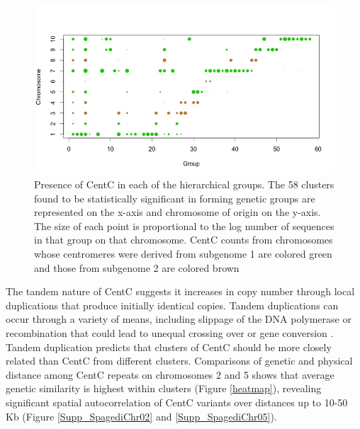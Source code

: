 \begin{figure}[h]
\centering
\includegraphics[width=1\textwidth]{Fig2_TWgroups}
\caption{Presence of CentC in each of the hierarchical groups.  The 58 clusters found to be statistically significant in forming genetic groups are represented on the x-axis and chromosome of origin on the y-axis. The size of each point is proportional to the log number of sequences in that group on that chromosome. CentC counts from chromosomes whose centromeres were derived from subgenome 1 are colored green and those from subgenome 2 are colored brown 
}
\label{pcoa}    
\end{figure}

The tandem nature of CentC suggests it increases in copy number through local duplications that produce initially identical copies.  
Tandem duplications can occur through a variety of means, including slippage of the DNA polymerase \citep{jeeeeeeff.} or recombination that could lead to unequal crossing over or gene conversion \citep{edlund1981recombination}.
Tandem duplication predicts that  clusters of CentC should be more closely related than CentC from different clusters.  
Comparisons of genetic and physical distance among CentC repeats on chromosomes 2 and 5 shows that average genetic similarity is highest within clusters (Figure \ref{heatmap}), revealing significant spatial autocorrelation of CentC variants over distances up to 10-50 Kb (Figure \ref{Supp_SpagediChr02} and \ref{Supp_SpagediChr05}).

